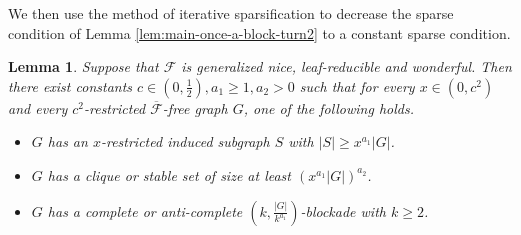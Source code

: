 \documentclass[a4paper,11pt]{article}
\newtheorem{lemma}[theorem]{Lemma}
\begin{document}
    We then use the method of iterative sparsification to decrease the sparse condition of Lemma \ref{lem:main-once-a-block-turn2} to a constant sparse condition. 
    \begin{lemma}\label{lem:main-iterative-sparsification-turn2}
        Suppose that $\mathcal{F}$ is generalized nice, leaf-reducible and wonderful. Then
        there exist constants $c\in (0,\frac{1}{2}), a_1\geq 1,a_2>0$ such that for every $x\in (0,c^2)$ and every $c^2$-restricted $\overline{\mathcal{F}}$-free graph $G$, one of the following holds.
        \begin{itemize}
            \item[$(1)$] $G$ has an $x$-restricted induced subgraph $S$ with $|S|\geq x^{a_1}|G|$.
            
            \item[$(2)$] $G$ has a clique or stable set of size at least $(x^{a_1}|G|)^{a_2}$.
            
            \item[$(3)$] $G$ has a complete or anti-complete $(k,\frac{|G|}{k^{a_1}})$-blockade with $k\geq 2$.
        \end{itemize}
    \end{lemma}
    
\end{document}
